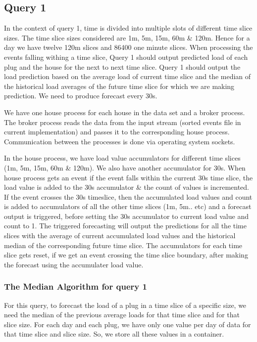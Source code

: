 \subsection{Query 1}
In the context of query 1, time is divided into multiple slots of different time slice sizes. The time slice sizes considered are 1m, 5m, 15m, 60m \& 120m. Hence for a day we have twelve 120m slices and 86400 one minute slices. When processing the events falling withing a time slice, Query 1 should output predicted load of each plug and the house for the next to next time slice. Query 1 should output the load prediction based on the average load of current time slice and the median of the historical load averages of the future time slice for which we are making prediction. We need to produce forecast every 30s.

We have one house process for each house in the data set and a broker process. The broker process reads the data from the input stream (sorted events file in current implementation) and passes it to the corresponding house process. Communication between the processes is done via operating system sockets.

In the house process, we have load value accumulators for different time slices (1m, 5m, 15m, 60m & 120m). We also have another accumulator for 30s. When house process gets an event if the event falls within the current 30s time slice, the load value is added to the 30s accumulator & the count of values is incremented. If the event crosses the 30s timeslice, then the accumulated load values and count is added to accumulators of all the other time slices (1m, 5m.. etc) and a forecast output is triggered, before setting the 30s accumulator to current load value and count to 1. The triggered forecasting will output the predictions for all the time slices with the average of current accumulated load values and the historical median of the corresponding future time slice. The accumulators for each time slice gets reset, if we get an event crossing the time slice boundary, after making the forecast using the accumulater load value.


\subsubsection{The Median Algorithm for query 1}
For this query, to forecast the load of a plug in a time slice of a specific size, we need the median of the previous average loads for that time slice and for that slice size. For each day and each plug, we have only one value per day of data for that time slice and slice size. So, we store all these values in a container.

